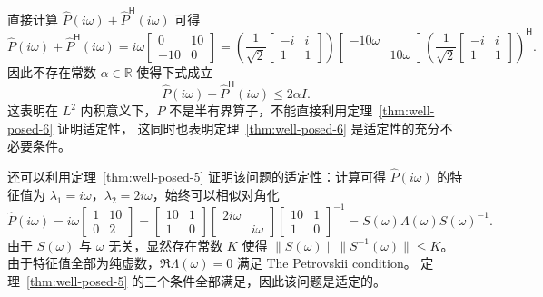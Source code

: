 \begin{remark}
    直接计算 $\widehat{P}(i\omega) + \widehat{P}^\mathsf{H} (i\omega)$ 可得
    \[
        \widehat{P}(i\omega) + \widehat{P}^\mathsf{H} (i\omega) = i \omega
        \begin{bmatrix}
            0 & 10 \\ -10 & 0
        \end{bmatrix}
        =
        \left(\frac{1}{\sqrt{2}}
        \begin{bmatrix}
            -i & i \\ 1 & 1
        \end{bmatrix}\right)
        \begin{bmatrix}
            -10 \omega & \\  & 10 \omega
        \end{bmatrix}
        \left(
        \frac{1}{\sqrt{2}}
        \begin{bmatrix}
            -i & i \\ 1 & 1
        \end{bmatrix}
        \right)^\mathsf{H}.
    \]
    因此不存在常数 $\alpha \in \mathbb{R}$ 使得下式成立
    \[
        \widehat{P}(i \omega) + \widehat{P}^\mathsf{H} (i \omega) \le 2\alpha I.
    \]
    这表明在 $L^2$ 内积意义下，$P$ 不是半有界算子，不能直接利用定理~\ref{thm:well-posed-6} 证明适定性，
    这同时也表明定理~\ref{thm:well-posed-6} 是适定性的充分不必要条件。
\end{remark}

\begin{remark}
    还可以利用定理~\ref{thm:well-posed-5} 证明该问题的适定性：计算可得 $\widehat{P}(i\omega)$ 的特征值为 $\lambda_1 = i \omega$，$\lambda_2 = 2 i \omega$，始终可以相似对角化
    \[
        \widehat{P}(i\omega) = i \omega
        \begin{bmatrix}
            1 & 10 \\ 0 & 2
        \end{bmatrix}
        =
        \begin{bmatrix}
            10 & 1 \\ 1 & 0
        \end{bmatrix}
        \begin{bmatrix}
            2 i \omega & \\ &  i \omega
        \end{bmatrix}
        \begin{bmatrix}
            10 & 1 \\ 1 & 0
        \end{bmatrix}^{-1}
        = S(\omega) \Lambda(\omega) S(\omega)^{-1}.
    \]
    由于 $S(\omega)$ 与 $\omega$ 无关，显然存在常数 $K$ 使得 $\| S(\omega) \| \| S^{-1}(\omega) \| \le K$。
    由于特征值全部为纯虚数，$\Re \Lambda(\omega) = 0$ 满足 The Petrovskii condition。
    定理~\ref{thm:well-posed-5} 的三个条件全部满足，因此该问题是适定的。
\end{remark}
